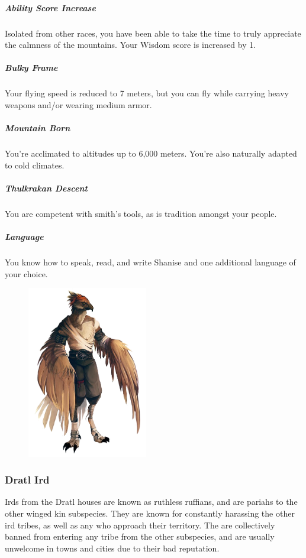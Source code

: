     \subparagraph{Ability Score Increase} Isolated from other races, you have been able to take the time to truly appreciate the calmness of the mountains.
    Your Wisdom score is increased by 1.

    \subparagraph{Bulky Frame} Your flying speed is reduced to 7 meters, but you can fly while carrying heavy weapons and/or wearing medium armor.

    \subparagraph{Mountain Born} You're acclimated to altitudes up to 6,000 meters.
    You're also naturally adapted to cold climates.

    \subparagraph{Thulkrakan Descent} You are competent with smith's tools, as is tradition amongst your people.

    \subparagraph{Language} You know how to speak, read, and write Shanise and one additional language of your choice.

\begin{figure}[!t]
    \centering
    \includegraphics[width=0.47\textwidth]{04kins/img/12ird_thulkraka.png}
\end{figure}

\subsubsection{Dratl Ird}
    Irds from the Dratl houses are known as ruthless ruffians, and are pariahs to the other winged kin subspecies.
    They are known for constantly harassing the other ird tribes, as well as any who approach their territory.
    The are collectively banned from entering any tribe from the other subspecies, and are usually unwelcome in towns and cities due to their bad reputation.

